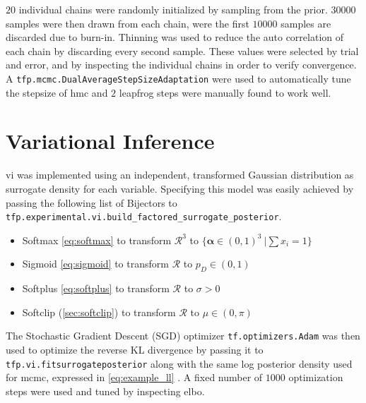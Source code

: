$20$ individual chains were randomly initialized by sampling from the prior. $30000$ samples were then drawn from each chain, were the first $10000$ samples are discarded due to burn-in. Thinning was used to reduce the auto correlation of each chain by discarding every second sample. These values were selected by trial and error, and by inspecting the individual chains in order to verify convergence. A \texttt{tfp.mcmc.DualAverageStepSizeAdaptation} were used to automatically tune the stepsize of \acrshort{hmc} and $2$ leapfrog steps were manually found to work well.  

\section{Variational Inference}

\acrshort{vi} was implemented using an independent, transformed Gaussian distribution as surrogate density for each variable. Specifying this model was easily achieved by passing the following list of Bijectors to \texttt{tfp.experimental.vi.build\_factored\_surrogate\_posterior}.
\begin{itemize}
\item Softmax \eqref{eq:softmax} to transform $\mathcal{R}^3$ to $\{\boldsymbol{\alpha} \in (0, 1)^3\ | \sum x_i = 1\}$
\item Sigmoid \eqref{eq:sigmoid} to transform $\mathcal{R}$ to $p_D \in (0, 1)$
\item Softplus \eqref{eq:softplus} to transform $\mathcal{R}$ to $\sigma > 0$
\item Softclip (\cref{sec:softclip}) to transform $\mathcal{R}$ to $\mu \in (0, \pi)$
\end{itemize}

The Stochastic Gradient Descent (SGD) optimizer \texttt{tf.optimizers.Adam} was then used to optimize the reverse KL divergence by passing it to \texttt{tfp.vi.fit\textunderscore surrogate\textunderscore posterior} along with the same log posterior density used for \acrshort{mcmc}, expressed in \cref{eq:example_ll} \cite{tensorflow2015-whitepaper}. A fixed number of $1000$ optimization steps were used and tuned by inspecting \acrshort{elbo}.


